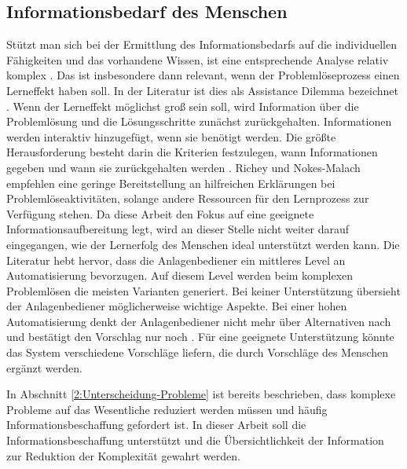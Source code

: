 \subsection{Informationsbedarf des Menschen}
\label{3:Informationsbedarf-Operator}
Stützt man sich bei der Ermittlung des Informationsbedarfs auf die individuellen Fähigkeiten und das vorhandene Wissen, ist eine entsprechende Analyse relativ komplex \cite{Richey2013}. Das ist insbesondere dann relevant, wenn der Problemlöseprozess einen Lerneffekt haben soll. In der Literatur ist dies als Assistance Dilemma bezeichnet \cite{Koedinger2007}. Wenn der Lerneffekt möglichst groß sein soll, wird Information über die Problemlösung und die Lösungsschritte zunächst zurückgehalten. Informationen werden interaktiv hinzugefügt, wenn sie benötigt werden. Die größte Herausforderung besteht darin die Kriterien festzulegen, wann Informationen gegeben und wann sie zurückgehalten werden \cite{Koedinger2007}.  Richey und Nokes-Malach \cite{Richey2013} empfehlen eine geringe Bereitstellung an hilfreichen Erklärungen bei Problemlöseaktivitäten, solange andere Ressourcen für den Lernprozess zur Verfügung stehen. Da diese Arbeit den Fokus auf eine geeignete Informationsaufbereitung legt, wird an dieser Stelle nicht weiter darauf eingegangen, wie der Lernerfolg des Menschen ideal unterstützt werden kann. Die Literatur \cite{Miller2005, Sauer2018} hebt hervor, dass die Anlagenbediener ein mittleres Level an Automatisierung bevorzugen. Auf diesem Level werden beim komplexen Problemlösen die meisten Varianten generiert. Bei keiner Unterstützung übersieht der Anlagenbediener möglicherweise wichtige Aspekte. Bei einer hohen Automatisierung denkt der Anlagenbediener nicht mehr über Alternativen nach und bestätigt den Vorschlag nur noch \cite{Miller2005}. Für eine geeignete Unterstützung könnte das System verschiedene Vorschläge liefern, die durch Vorschläge des Menschen ergänzt werden.

In Abschnitt \ref{2:Unterscheidung-Probleme} ist bereits beschrieben, dass komplexe Probleme auf das Wesentliche reduziert werden müssen und häufig Informationsbeschaffung gefordert ist. In dieser Arbeit soll die Informationsbeschaffung unterstützt und die Übersichtlichkeit der Information zur Reduktion der Komplexität gewahrt werden.

